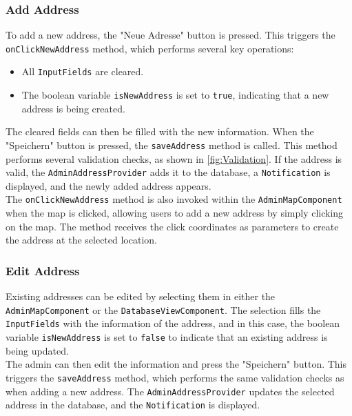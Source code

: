 \newpage

\subsubsection{Add Address}
    \label{fig:Add Address}

    To add a new address, the "Neue Adresse" button is pressed. This triggers the \texttt{onClickNewAddress} method, which performs several key operations:  

    \begin{itemize}  
        \item All \texttt{InputFields} are cleared.  
        \item The boolean variable \texttt{isNewAddress} is set to \texttt{true}, indicating that a new address is being created.  
    \end{itemize}  
    
    The cleared fields can then be filled with the new information. When the "Speichern" button is pressed, the \texttt{saveAddress} method is called. This method performs several validation checks, as shown in \ref{fig:Validation}. If the address is valid, the \texttt{AdminAddressProvider} adds it to the database, a \texttt{Notification} is displayed, and the newly added address appears.\\
    
    The \texttt{onClickNewAddress} method is also invoked within the \texttt{AdminMapComponent} when the map is clicked, allowing users to add a new address by simply clicking on the map. The method receives the click coordinates as parameters to create the address at the selected location.  
    

\subsubsection{Edit Address}
\sloppy %
Existing addresses can be edited by selecting them in either the \texttt{AdminMapComponent} or the \texttt{DatabaseViewComponent}.
The selection fills the \texttt{InputFields} with the information of the address, and in this case, the boolean variable \texttt{isNewAddress} is set to \texttt{false} to indicate that an existing address is being updated.\\

\sloppy
The admin can then edit the information and press the "Speichern" button. This triggers the \texttt{saveAddress} method, which performs the same validation checks as when adding a new address. The \texttt{AdminAddressProvider} updates the selected address in the database, and the \texttt{Notification} is displayed.

